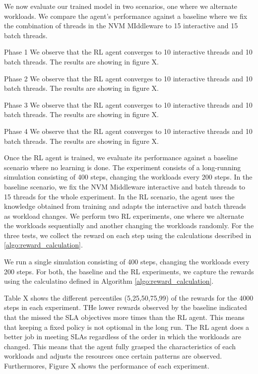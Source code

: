 We now evaluate our trained model in two scenarios, one where we alternate workloads. We compare the agent's performance against a baseline where we fix the combination of threads in the NVM MIddleware to 15 interactive and 15 batch threads.

Phase 1
We observe that the RL agent converges to 10 interactive threads and 10 batch threads. The results are showing in figure X.

Phase 2
We observe that the RL agent converges to 10 interactive threads and 10 batch threads. The results are showing in figure X.

Phase 3
We observe that the RL agent converges to 10 interactive threads and 10 batch threads. The results are showing in figure X.

Phase 4
We observe that the RL agent converges to 10 interactive threads and 10 batch threads. The results are showing in figure X.

Once the RL agent is trained, we evaluate its performance against a baseline scenario where no learning is done. The experiment consists of a long-running simulation consisting of 400 steps, changing the workloads every 200 steps. In the baseline scenario, we fix the NVM Middleware interactive and batch threads to 15 threads for the whole experiment. In the RL scenario, the agent uses the knowledge obtained from training and adapts the interactive and batch threads as workload changes. We perform two RL experiments, one where we alternate the workloads sequentially and another changing the workloads randomly. For the three tests, we collect the reward on each step using the calculations described in \ref{algo:reward_calculation}.

We run a single simulation consisting of 400 steps, changing the workloads every 200 steps. For both, the baseline and the RL experiments, we capture the rewards using the calculatino defined in Algorithm \ref{algo:reward_calculation}.

Table X shows the different percentiles (5,25,50,75,99) of the rewards for the 4000 steps in each experiment. THe lower rewards observed by the baseline indicated that the missed the SLA objectives more times than the RL agent. This means that keeping a fixed policy is not optiomal in the long run. The RL agent does a better job in meeting SLAs regardless of the order in which the workloads are changed. This means that the agent fully grasped the characteristics of each workloads and adjusts the resources once certain patterns are observed. Furthermores, Figure X shows the performance of each experiment.
